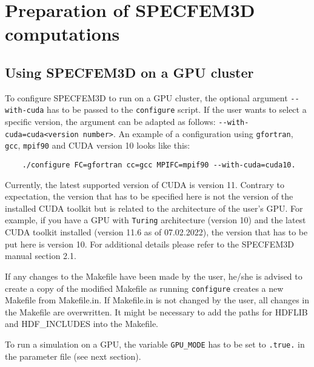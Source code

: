%
\section{Preparation of SPECFEM3D computations}
%
\subsection{Using SPECFEM3D on a GPU cluster}
To configure SPECFEM3D to run on a GPU cluster, the optional argument \verb+--with-cuda+ has to be passed to the \verb+configure+ script. If the user wants to select a specific version, the argument can be adapted as follows: \verb+--with-cuda=cuda<version number>+. An example of a configuration using \verb+gfortran+, \verb+gcc+, \verb+mpif90+ and CUDA version 10 looks like this:
\begin{verbatim}
	./configure FC=gfortran cc=gcc MPIFC=mpif90 --with-cuda=cuda10.
\end{verbatim}
Currently, the latest supported version of CUDA is version 11. Contrary to expectation, the version that has to be specified here is not the version of the installed CUDA toolkit but is related to the architecture of the user's GPU. For example, if you have a GPU with \verb+Turing+ architecture (version 10) and the latest CUDA toolkit installed (version 11.6 as of 07.02.2022), the version that has to be put here is version 10. For additional details please refer to the SPECFEM3D manual section 2.1.

If any changes to the Makefile have been made by the user, he/she is advised to create a copy of the modified Makefile as running \verb+configure+ creates a new Makefile from Makefile.in. If Makefile.in is not changed by the user, all changes in the Makefile are overwritten.
It might be necessary to add the paths for HDFLIB and HDF\_INCLUDES into the Makefile.

To run a simulation on a GPU, the variable \verb+GPU_MODE+ has to be set to \verb+.true.+ in the parameter file (see next section).
%
